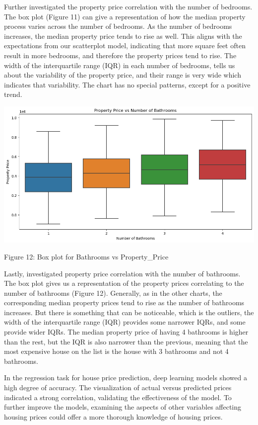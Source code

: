 \documentclass{article}
\begin{document}
\begin{multicols}{2}
Further investigated the property price correlation with the number of bedrooms. The box plot (Figure 11) can give a representation of how the median property process varies across the number of bedrooms. As the number of bedrooms increases, the median property price tends to rise as well. This aligns with the expectations from our scatterplot model, indicating that more square feet often result in more bedrooms, and therefore the property prices tend to rise. The width of the interquartile range (IQR) in each number of bedrooms, tells us about the variability of the property price, and their range is very wide which indicates that variability. The chart has no special patterns, except for a positive trend.

\includegraphics[scale=.25]{img/dl3.png}

{\small
  Figure 12: Box plot for Bathrooms vs Property\_Price
  \par
  \vspace{6pt}
}


Lastly, investigated property price correlation with the number of bathrooms. The box plot gives us a representation of the property prices correlating to the number of bathrooms (Figure 12). Generally, as in the other charts, the corresponding median property prices tend to rise as the number of bathrooms increases. But there is something that can be noticeable, which is the outliers, the width of the interquartile range (IQR) provides some narrower IQRs, and some provide wider IQRs. The median property price of having 4 bathrooms is higher than the rest, but the IQR is also narrower than the previous, meaning that the most expensive house on the list is the house with 3 bathrooms and not 4 bathrooms. 

In the regression task for house price prediction, deep learning models showed a high degree of accuracy. The visualization of actual versus predicted prices indicated a strong correlation, validating the effectiveness of the model. To further improve the models, examining the aspects of other variables affecting housing prices could offer a more thorough knowledge of housing prices. 


\end{multicols}
\end{document}
